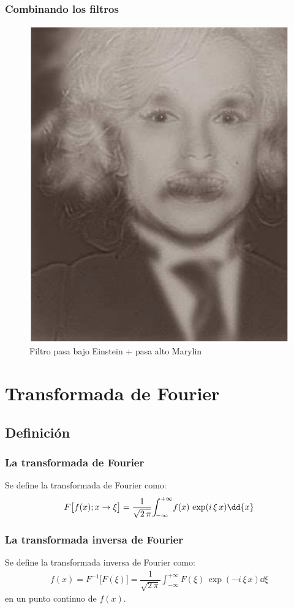 \begin{frame}
\frametitle{Combinando los filtros}
\begin{figure}
    \includegraphics[scale=0.25]{Imagenes/Einstein_Marylin_BA_01.eps}
    \caption{Filtro pasa bajo Einstein + pasa alto Marylin}
\end{figure}
\end{frame}

\section{Transformada de Fourier}
\subsection{Definición}

\begin{frame}
\frametitle{La transformada de Fourier}
Se define la transformada de Fourier como:
\begin{align}
F \big[ f(x); x \to \xi \big] = \dfrac{1}{\sqrt{2 \, \pi}} \scaleint{5ex}_{\bs -\infty}^{+\infty} f(x) \, \exp(i \, \xi \, x) \dd{x}
\label{eq:ecuacion_01_12}
\end{align}
\end{frame}
\begin{frame}
\frametitle{La transformada inversa de Fourier}
Se define la transformada inversa de Fourier como:
\begin{align}
f(x) = F^{-1} \big[ F(\xi) \big] = \dfrac{1}{\sqrt{2 \, \pi}} \int_{-\infty}^{+\infty} F(\xi) \, \exp(-i \, \xi \, x) \dd{\xi}
\label{eq:ecuacion_01_13}
\end{align}
en un punto continuo de $f(x)$.
\end{frame}

